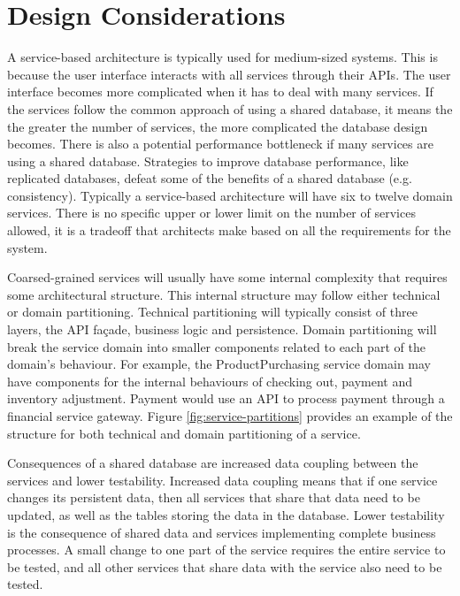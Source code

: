 \section{Design Considerations}\label{sec:design-considerations}

A service-based architecture is typically used for medium-sized systems.
This is because the user interface interacts with all services through their APIs.
The user interface becomes more complicated when it has to deal with many services.
If the services follow the common approach of using a shared database,
it means the the greater the number of services, the more complicated the database design becomes.
There is also a potential performance bottleneck if many services are using a shared database.
Strategies to improve database performance, like replicated databases, defeat some of the benefits of a shared database (e.g. consistency).
Typically a service-based architecture will have six to twelve domain services.
There is no specific upper or lower limit on the number of services allowed,
it is a tradeoff that architects make based on all the requirements for the system.

Coarsed-grained services will usually have some internal complexity that requires some architectural structure.
This internal structure may follow either technical or domain partitioning.
Technical partitioning will typically consist of three layers, the API façade, business logic and persistence.
Domain partitioning will break the service domain into smaller components related to each part of the domain's behaviour.
For example, the ProductPurchasing service domain may have components for the internal behaviours of checking out,
payment and inventory adjustment. Payment would use an API to process payment through a financial service gateway.
Figure \ref{fig:service-partitions} provides an example of the structure for both technical and domain partitioning of a service.


Consequences of a shared database are increased data coupling between the services and lower testability.
Increased data coupling means that if one service changes its persistent data,
then all services that share that data need to be updated, as well as the tables storing the data in the database.
Lower testability is the consequence of shared data and services implementing complete business processes.
A small change to one part of the service requires the entire service to be tested,
and all other services that share data with the service also need to be tested.

